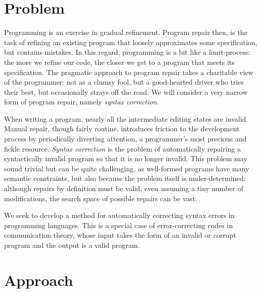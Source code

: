 \documentclass[sigplan,screen]{acmart}
\begin{document}
\section{Problem}


Programming is an exercise in gradual refinement. Program repair then, is the task of refining an existing program that loosely approximates some specification, but contains mistakes. In this regard, programming is a bit like a limit-process: the more we refine our code, the closer we get to a program that meets its specification. The pragmatic approach to program repair takes a charitable view of the programmer: not as a clumsy fool, but a good-hearted driver who tries their best, but occasionally strays off the road. We will consider a very narrow form of program repair, namely \emph{syntax correction}.

When writing a program, nearly all the intermediate editing states are invalid. Manual repair, though fairly routine, introduces friction to the development process by periodically diverting attention, a programmer's most precious and fickle resource. \textit{Syntax correction} is the problem of automatically repairing a syntactically invalid program so that it is no longer invalid. This problem may sound trivial but can be quite challenging, as well-formed programs have many semantic constraints, but also because the problem itself is under-determined: although repairs by definition must be valid, even assuming a tiny number of modifications, the search space of possible repairs can be vast.

We seek to develop a method for automatically correcting syntax errors in programming languages. This is a special case of error-correcting codes in communication theory, whose input takes the form of an invalid or corrupt program and the output is a valid program.

\section{Approach}

\end{document}
